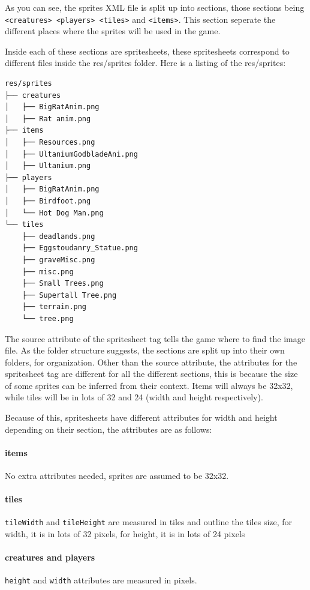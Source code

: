 \documentclass{book}
\begin{document}
	As you can see, the sprites XML file is split up into sections, those sections being \texttt{<creatures> <players> <tiles>} and \texttt{<items>}. This section seperate the different places where the sprites will be used in the game.

Inside each of these sections are spritesheets, these spritesheets correspond to different files inside the res/sprites folder. Here is a listing of the res/sprites:

\begin{lstlisting}
res/sprites
├── creatures
│   ├── BigRatAnim.png
│   ├── Rat anim.png
├── items
│   ├── Resources.png
│   ├── UltaniumGodbladeAni.png
│   ├── Ultanium.png
├── players
│   ├── BigRatAnim.png
│   ├── Birdfoot.png
│   └── Hot Dog Man.png
└── tiles
    ├── deadlands.png
    ├── Eggstoudanry_Statue.png
    ├── graveMisc.png
    ├── misc.png
    ├── Small Trees.png
    ├── Supertall Tree.png
    ├── terrain.png
    └── tree.png
\end{lstlisting}

The source attribute of the spritesheet tag tells the game where to find the image file. As the folder structure suggests, the sections are split up into their own folders, for organization. Other than the source attribute, the attributes for the spritesheet tag are different for all the different sections, this is because the size of some sprites can be inferred from their context. Items will always be 32x32, while tiles will be in lots of 32 and 24 (width and height respectively). 

Because of this, spritesheets have different attributes for width and height depending on their section, the attributes are as follows:

\paragraph{items} No extra attributes needed, sprites are assumed to be 32x32.
\paragraph{tiles} \texttt{tileWidth} and \texttt{tileHeight} are measured in tiles and outline the tiles size, for width, it is in lots of 32 pixels, for height, it is in lots of 24 pixels
\paragraph{creatures and players} \texttt{height} and \texttt{width} attributes are measured in pixels.
\end{document}
